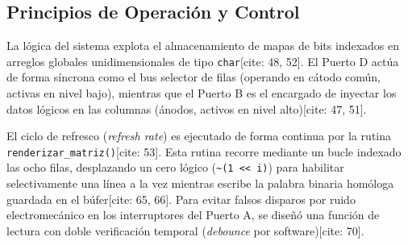 \subsection{Principios de Operación y Control}
La lógica del sistema explota el almacenamiento de mapas de bits indexados en arreglos globales unidimensionales de tipo \texttt{char}[cite: 48, 52]. El Puerto D actúa de forma síncrona como el bus selector de filas (operando en cátodo común, activas en nivel bajo), mientras que el Puerto B es el encargado de inyectar los datos lógicos en las columnas (ánodos, activos en nivel alto)[cite: 47, 51].

El ciclo de refresco (\textit{refresh rate}) es ejecutado de forma continua por la rutina \texttt{renderizar\_matriz()}[cite: 53]. Esta rutina recorre mediante un bucle indexado las ocho filas, desplazando un cero lógico (\texttt{\~{}(1 << i)}) para habilitar selectivamente una línea a la vez mientras escribe la palabra binaria homóloga guardada en el búfer[cite: 65, 66]. Para evitar falsos disparos por ruido electromecánico en los interruptores del Puerto A, se diseñó una función de lectura con doble verificación temporal (\textit{debounce} por software)[cite: 70].

